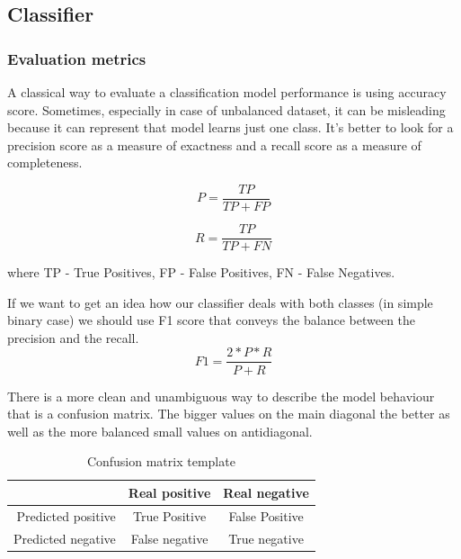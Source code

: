 \documentclass[11pt]{article}
\begin{document}
\subsection{Classifier}


\subsubsection{Evaluation metrics}

A classical way to evaluate a classification model performance is using accuracy score. Sometimes, especially in case of unbalanced dataset, it can be misleading because it can represent that model learns just one class. It’s better to look for a precision score as a measure of exactness and a recall score as a measure of completeness.

\begin{equation}
P = \frac{TP}{TP+FP} 
\end{equation}

\begin{equation}
R = \frac{TP}{TP+FN}
\end{equation}

where TP - True Positives, FP - False Positives, FN - False Negatives.

If we want to get an idea how our classifier deals with both classes (in simple binary case) we should use F1 score that conveys the balance between the precision and the recall.
\begin{equation}
F1 = \frac{2*P*R}{P+R}
\end{equation}

    There is a more clean and unambiguous way to describe the model behaviour that is a confusion matrix. The bigger values on the main diagonal the better as well as the more balanced small values on antidiagonal.

\begin{table}[htb]
\begin{center}
\begin{tabular}{ |r|c|c| }
\hline
& Real positive & Real negative \\ \hline
Predicted positive & True Positive 	& False Positive \\ \hline
Predicted negative & False negative & True negative \\ \hline
\end{tabular}
\caption{Confusion matrix template}
\end{center}
\end{table}
\FloatBarrier
\end{document}
